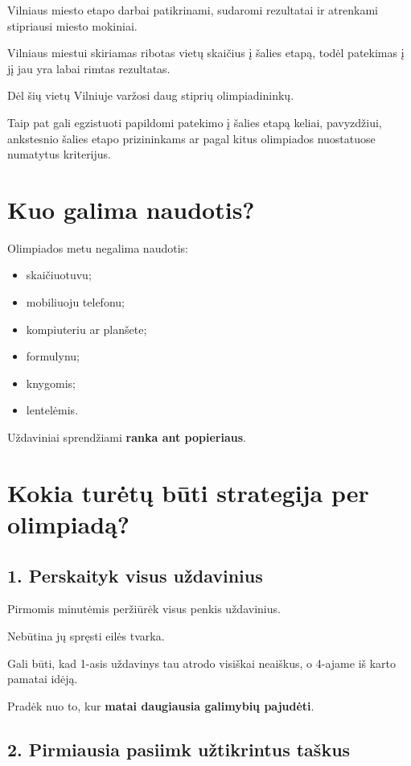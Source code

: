 \documentclass[11pt,a4paper]{article}
\begin{document}
Vilniaus miesto etapo darbai patikrinami, sudaromi rezultatai ir atrenkami stipriausi miesto mokiniai.

Vilniaus miestui skiriamas ribotas vietų skaičius į šalies etapą, todėl patekimas į jį jau yra labai rimtas rezultatas.

Dėl šių vietų Vilniuje varžosi daug stiprių olimpiadininkų.

Taip pat gali egzistuoti papildomi patekimo į šalies etapą keliai, pavyzdžiui, ankstesnio šalies etapo prizininkams ar pagal kitus olimpiados nuostatuose numatytus kriterijus.

\section{Kuo galima naudotis?}

Olimpiados metu negalima naudotis:
\begin{itemize}
  \item skaičiuotuvu;
  \item mobiliuoju telefonu;
  \item kompiuteriu ar planšete;
  \item formulynu;
  \item knygomis;
  \item lentelėmis.
\end{itemize}

Uždaviniai sprendžiami \textbf{ranka ant popieriaus}.

\section{Kokia turėtų būti strategija per olimpiadą?}

\subsection{1. Perskaityk visus uždavinius}

Pirmomis minutėmis peržiūrėk visus penkis uždavinius.

Nebūtina jų spręsti eilės tvarka.

Gali būti, kad 1-asis uždavinys tau atrodo visiškai neaiškus, o 4-ajame iš karto pamatai idėją.

Pradėk nuo to, kur \textbf{matai daugiausia galimybių pajudėti}.

\subsection{2. Pirmiausia pasiimk užtikrintus taškus}
\end{document}
